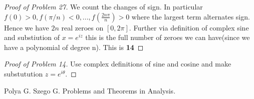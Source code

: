 \documentclass[10pt]{article}
\newcommand{\1}{\textbf{1}}
\theoremstyle{remark}
\theoremstyle{definition}
\begin{document}
\begin{proof}[Proof of Problem 27]
	We count the changes of sign. In particular $f(0) > 0, f(\pi/n) < 0, ..., f(\frac{2 n \pi}{n}) > 0$ where the largest term alternates sign. Hence we have $2n$ real zeroes on $[0,2\pi]$. Further via definition of complex sine and substiution of $x = e^{iz}$ this is the full number of zeroes we can have(since we have a polynomial of degree n). This is \textbf{14}
\end{proof}

\begin{proof}[Proof of Problem 14]
	Use complex definitions of sine and cosine and make substutution $z=e^{i\theta}$.
\end{proof}



\begin{thebibliography}{9}

 Polya G. Szego G. Problems and Theorems in Analysis. 

\end{thebibliography}
\end{document}
